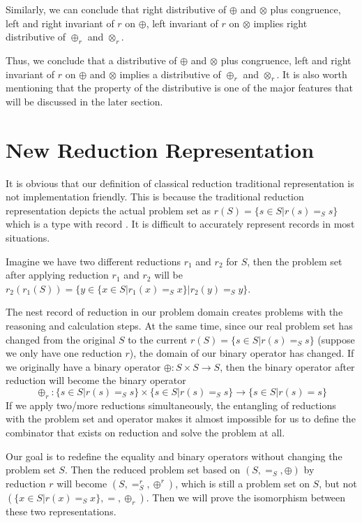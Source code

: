 \documentclass[a4paper,12pt,twoside,openright]{report}
\begin{document}
Similarly, we can conclude that right distributive of $\oplus$ and $\otimes$ plus congruence, left and right invariant of $r$ on $\oplus$, left invariant of $r$ on $\otimes$ implies right distributive of $\oplus_r$ and $\otimes_r$.

Thus, we conclude that a distributive of $\oplus$ and $\otimes$ plus congruence, left and right invariant of $r$ on $\oplus$ and $\otimes$ implies a distributive of $\oplus_r$ and $\otimes_r$.
It is also worth mentioning that the property of the distributive is one of the major features that will be discussed in the later section.

\section{New Reduction Representation}
It is obvious that our definition of classical reduction traditional representation is not implementation friendly.
This is because the traditional reduction representation depicts the actual problem set as $r(S) = \{s\in S|r(s)=_S s\}$ which is a type with record . It is difficult to accurately represent records in most situations. 

Imagine we have two different reductions $r_1$ and $r_2$ for $S$, then the problem set after applying reduction $r_1$ and $r_2$ will be $r_2(r_1(S)) = \{y\in \{x \in S | r_1(x) =_S x\}|r_2(y)=_S y\}$. 

The nest  record of reduction in our problem domain creates problems with the reasoning and calculation steps. 
At the same time, since our real problem set has changed from the original $S$ to the current $r(S) = \{s\in S|r(s)=_S s\}$ (suppose we only have one reduction $r$), the domain of our binary operator has changed. If we originally have a binary operator $\oplus : S\times S \rightarrow S$, then the binary operator after reduction will become the binary operator \[\oplus_r : \{s\in S|r(s)=_S s\} \times \{s\in S|r(s)=_S s\} \rightarrow \{s\in S|r(s)= s\}\] If we apply two/more reductions simultaneously, the entangling of reductions with the problem set and operator makes it almost impossible for us to define the combinator that exists on reduction and solve the problem at all.

Our goal is to redefine the equality and binary operators without changing the problem set $S$. 
Then the reduced problem set based on $(S,=_S,\oplus)$ by reduction $r$ will become $(S,=^r_S,\oplus^r)$, which is still a problem set on $S$, but not $(\{x \in S | r(x) =_S x\}, =,\oplus_r)$. 
Then we will prove the isomorphism between these two representations.
\end{document}
